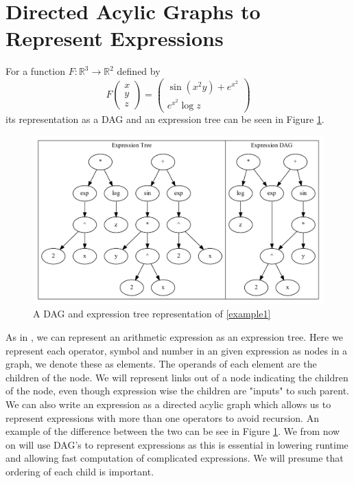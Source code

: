 \documentclass{article}
\begin{document}
\section{Directed Acylic Graphs to Represent Expressions}

For a function $F: \mathbb{R}^3 \rightarrow \mathbb{R}^2$ defined by
\begin{equation} \label{example1}
    F \begin{pmatrix}
        x \\ y \\ z
    \end{pmatrix} = \begin{pmatrix}
        \sin (x^2 y) + e^{x^2} \\ e^{x^2} \log z
    \end{pmatrix}
\end{equation}
its representation as a DAG and an expression tree can be seen in Figure \ref{fig:DAGgraph2}.

\begin{figure}[h]
    \centering
    \includegraphics[width=12cm]{images/Graph_Cluster_1.pdf}
    \caption{A DAG and expression tree representation of \eqref{example1}}
    \label{fig:DAGgraph2}
\end{figure}

As in \cite{PoPBook}, we can represent an arithmetic expression as an expression tree. Here we represent each operator, symbol and number in an given expression as nodes in a graph, we denote these as elements. The operands of each element are the children of the node. We will represent links out of a node indicating the children of the node, even though expression wise the children are "inputs" to such parent. We can also write an expression as a directed acylic graph which allows us to represent expressions with more than one operators to avoid recursion. An example of the difference between the two can be see in Figure \ref{fig:DAGgraph2}. We from now on will use DAG's to represent expressions as this is essential in lowering runtime and allowing fast computation of complicated expressions. We will presume that ordering of each child is important.
\end{document}
